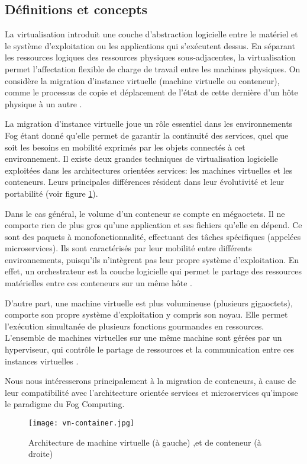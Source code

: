 \subsection{Définitions et concepts}
La virtualisation introduit une couche d'abstraction logicielle entre le matériel et le système d'exploitation ou les applications qui s'exécutent dessus. En séparant les ressources logiques des ressources physiques sous-adjacentes, la virtualisation permet l'affectation flexible de charge de travail entre les machines physiques.
On considère la migration d'instance virtuelle (machine virtuelle ou conteneur), comme le processus de copie et déplacement de l'état de cette dernière d'un hôte physique à un autre \cite{boutaba2013}.\par
La migration d'instance virtuelle joue un rôle essentiel dans les environnements Fog étant donné qu'elle permet de garantir la continuité des services, quel que soit les besoins en mobilité exprimés par les objets connectés à cet environnement.
Il existe deux grandes techniques de virtualisation logicielle exploitées dans les architectures orientées services: les machines virtuelles et les conteneurs. Leurs principales différences résident dans leur évolutivité et leur portabilité \cite{redhat} (voir figure \ref{fig:vmvsconteneur}).\par
Dans le cas général, le volume d'un conteneur se compte en mégaoctets. Il ne comporte rien de plus gros qu'une application et ses fichiers qu'elle en dépend. Ce sont des paquets à monofonctionnalité, effectuant des tâches spécifiques (appelées microservices). Ils sont caractérisés par leur mobilité entre différents environnements, puisqu'ils n'intègrent pas leur propre système d'exploitation. En effet, un orchestrateur est la couche logicielle qui permet le partage des ressources matérielles entre ces conteneurs sur un même hôte \cite{redhat}.\par
D'autre part, une machine virtuelle est plus volumineuse (plusieurs gigaoctets), comporte son propre système d'exploitation y compris son noyau. Elle permet l'exécution simultanée de plusieurs fonctions gourmandes en ressources. L'ensemble de machines virtuelles sur une même machine sont gérées par un hyperviseur, qui contrôle le partage de ressources et la communication entre ces instances virtuelles \cite{microsoft2019}.\par
Nous nous intéresserons principalement à la migration de conteneurs, à cause de leur compatibilité avec l'architecture orientée services et microservices qu'impose le paradigme du Fog Computing.
\begin{figure}[H]
\centering
\texttt{[image: vm-container.jpg]}
\caption{Architecture de machine virtuelle (à gauche) ,et de conteneur (à droite) \cite{alibabacloud}}
\label{fig:vmvsconteneur}
\end{figure}
